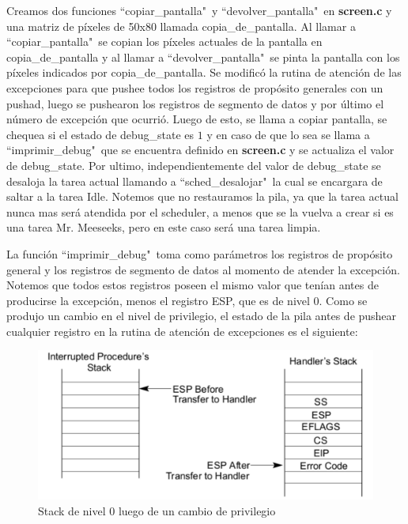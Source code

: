\documentclass[a4paper]{article}
\begin{document}
\justify
Creamos dos funciones ``copiar_pantalla"\ y ``devolver_pantalla"\ en \textbf{screen.c} y una matriz de píxeles de 50x80 llamada copia_de_pantalla. Al llamar a ``copiar_pantalla"\ se copian los píxeles actuales de la pantalla en copia_de_pantalla y al llamar a ``devolver_pantalla"\ se pinta la pantalla con los píxeles indicados por copia_de_pantalla.
\justify
Se modificó la rutina de atención de las excepciones para que pushee todos los registros de propósito generales con un pushad, luego se pushearon los registros de segmento de datos y por último el número de excepción que ocurrió. Luego de esto, se llama a copiar pantalla, se chequea si el estado de debug_state es $1$ y en caso de que lo sea se llama a ``imprimir_debug"\ que se encuentra definido en \textbf{screen.c} y se actualiza el valor de debug\_state. Por ultimo, independientemente del valor de debug_state se desaloja la tarea actual llamando a ``sched_desalojar"\, la cual se encargara de saltar a la tarea Idle. Notemos que no restauramos la pila, ya que la tarea actual nunca mas será atendida por el scheduler, a menos que se la vuelva a crear si es una tarea Mr. Meeseeks, pero en este caso será una tarea limpia.

\justify
La función ``imprimir_debug"\ toma como parámetros los registros de propósito general y los registros de segmento de datos al momento de atender la excepción. Notemos que todos estos registros poseen el mismo valor que tenían antes de producirse la excepción, menos el registro ESP, que es de nivel 0. Como se produjo un cambio en el nivel de privilegio, el estado de la pila antes de pushear cualquier registro en la rutina de atención de excepciones es el siguiente:

\begin{figure}[h]
	\centering
	\includegraphics[scale=0.6]{img/pilaCambioPrivilegioManual.pdf}
	\caption{Stack de nivel 0 luego de un cambio de privilegio}
	\label{fig:cambio_privilegio}
\end{figure}
\end{document}
